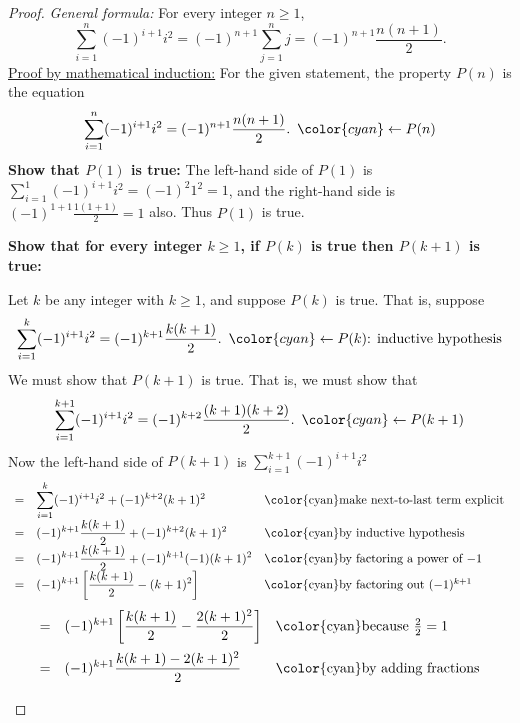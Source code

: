 \documentclass[14pt]{extarticle}
\newcommand{\dps}{\displaystyle}
\newcommand{\from}{\leftarrow}
\newcommand{\cy}{\color{cyan}}
\begin{document}
\begin{proof}
    {\it General formula:} For every integer $n \geq 1$,
    \[
        \dps \sum_{i=1}^n (-1)^{i+1}i^2 = (-1)^{n+1}\sum_{j=1}^{n}j = (-1)^{n+1}\frac{n(n+1)}{2}.
    \]
    \underline{Proof by mathematical induction:}
    For the given statement, the property $P(n)$ is the equation
    \[
        \dps \sum_{i=1}^n (-1)^{i+1}i^2 = (-1)^{n+1}\frac{n(n+1)}{2}. \,\,\, {\cy \from P(n)}
    \]
    {\bf Show that $P(1)$ is true:} The left-hand side of $P(1)$ is $\dps \sum_{i=1}^1 (-1)^{i+1}i^2 = (-1)^2 1^2 = 1$, and the right-hand side is $\dps (-1)^{1+1}\frac{1(1+1)}{2} = 1$ also. Thus $P(1)$ is true.

        {\bf Show that for every integer $k \geq 1$, if $P(k)$ is true then $P(k + 1)$ is true:}

    Let $k$ be any integer with $k \geq 1$, and suppose $P(k)$ is true. That is, suppose
    \[
        \dps \sum_{i=1}^k (-1)^{i+1}i^2 = (-1)^{k+1}\frac{k(k+1)}{2}. \,\,\, {\cy \from P(k) \text{: inductive hypothesis}}
    \]
    We must show that $P(k + 1)$ is true. That is, we must show that
    \[
        \dps \sum_{i=1}^{k+1} (-1)^{i+1}i^2 = (-1)^{k+2}\frac{(k+1)(k+2)}{2}. \,\,\,{\cy \from P(k+1)}
    \]
    Now the left-hand side of $P(k + 1)$ is $\dps \sum_{i=1}^{k+1} (-1)^{i+1}i^2$
    \[
        \begin{array}{lll}
            = & \dps \sum_{i=1}^{k} (-1)^{i+1}i^2 + (-1)^{k+2}(k+1)^2   & \text{\cy make next-to-last term explicit} \\
            = & \dps (-1)^{k+1}\frac{k(k+1)}{2} + (-1)^{k+2}(k+1)^2     & \text{\cy by inductive hypothesis}         \\
            = & \dps (-1)^{k+1}\frac{k(k+1)}{2} + (-1)^{k+1}(-1)(k+1)^2 & \text{\cy by factoring a power of $-1$}    \\
            = & \dps (-1)^{k+1}\left[\frac{k(k+1)}{2} - (k+1)^2\right]  & \text{\cy by factoring out $(-1)^{k+1}$}   \\
        \end{array}
    \]
    \[
        \begin{array}{lll}
            \vspace{0.2cm}
            = & \dps (-1)^{k+1}\left[\frac{k(k+1)}{2} -\frac{2(k+1)^2}{2}\right] & \text{\cy because $\frac{2}{2} = 1$} \\
            \vspace{0.2cm}
            = & \dps (-1)^{k+1}\frac{k(k+1)-2(k+1)^2}{2}                         & \text{\cy by adding fractions}       \\

\end{array}\]
\end{proof}
\end{document}
